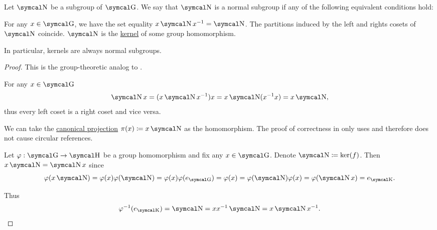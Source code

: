 \begin{definition}\label{def:normal_subgroup}
  Let \( \CN \) be a subgroup of \( \CG \). We say that \( \CN \) is a normal subgroup if any of the following equivalent conditions hold:
  \begin{DefEnum}
     For any \( x \in \CG \), we have the set equality \( x \CN x^{-1} = \CN \).
     The partitions induced by the left and rights cosets of \( \CN \) coincide.
     \( \CN \) is the \hyperref[def:unital_magma_kernel]{kernel} of some group homomorphism.
  \end{DefEnum}

  In particular, kernels are always normal subgroups.
\end{definition}
\begin{proof}
  This is the group-theoretic analog to .

   For any \( x \in \CG \)
  \begin{equation*}
    \CN x = (x \CN x^{-1})x = x \CN(x^{-1}x) = x \CN,
  \end{equation*}
  thus every left coset is a right coset and vice versa.

   We can take the \hyperref[def:quotient_group]{canonical projection} \( \pi(x) \coloneqq x \CN \) as the homomorphism. The proof of correctness in  only uses  and therefore does not cause circular references.

   Let \( \varphi: \CG \to \CH \) be a group homomorphism and fix any \( x \in \CG \). Denote \( \CN \coloneqq \ker(f) \). Then \( x \CN = \CN x \) since
  \begin{equation*}
    \varphi(x \CN)
    =
    \varphi(x) \varphi(\CN)
    =
    \varphi(x) \varphi(e_{\CG})
    =
    \varphi(x)
    =
    \varphi(\CN) \varphi(x)
    =
    \varphi(\CN x)
    =
    e_{\CK}.
  \end{equation*}

  Thus
  \begin{equation*}
    \varphi^{-1}(e_{\CK}) = \CN = xx^{-1}\CN = x \CN x^{-1}.
  \end{equation*}
\end{proof}

